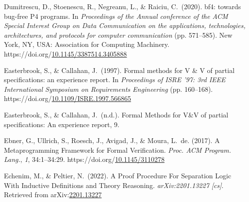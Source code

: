 \documentclass[12pt,twoside]{article}
\begin{document}
{\begin{thebibliography}{1079}
\mdbibitemlabel{}Dumitrescu, D., Stoenescu, R., Negreanu, L., \& Raiciu, C.~(2020). bf4: towards bug-free P4 programs. In \emph{Proceedings of the Annual conference of the ACM Special Interest Group on Data Communication on the applications, technologies, architectures, and protocols for computer communication} (pp. 571–585). New York, NY, USA: Association for Computing Machinery. https://doi.org/\href{https://dx.doi.org/10.1145/3387514.3405888}{10.1145/3387514.3405888}%

\mdbibitemlabel{}Easterbrook, S., \& Callahan, J.~(1997). Formal methods for V \& V of partial specifications: an experience report. In \emph{Proceedings of ISRE ’97: 3rd IEEE International Symposium on Requirements Engineering} (pp. 160–168). https://doi.org/\href{https://dx.doi.org/10.1109/ISRE.1997.566865}{10.1109/ISRE.1997.566865}%

\mdbibitemlabel{}Easterbrook, S., \& Callahan, J.~(n.d.). Formal Methods for V\&V of partial specifications: An experience report, 9.%

\mdbibitemlabel{}Ebner, G., Ullrich, S., Roesch, J., Avigad, J., \& Moura, L.~de. (2017). A Metaprogramming Framework for Formal Verification. \emph{Proc. ACM Program. Lang.}, \emph{1}, 34:1–34:29. https://doi.org/\href{https://dx.doi.org/10.1145/3110278}{10.1145/3110278}%

\mdbibitemlabel{}Echenim, M., \& Peltier, N.~(2022). A Proof Procedure For Separation Logic With Inductive Definitions and Theory Reasoning. \emph{arXiv:2201.13227 {}[cs]}. Retrieved from arXiv:\href{http://arxiv.org/abs/2201.13227}{2201.13227}%


\end{thebibliography}}
\end{document}
